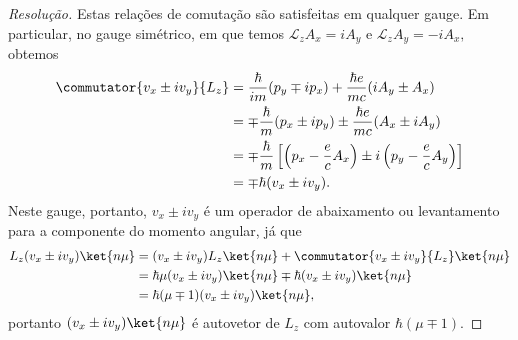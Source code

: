 \begin{proof}[Resolução]
   Estas relações de comutação são satisfeitas em qualquer gauge. Em particular, no gauge simétrico, em que temos \(\mathcal{L}_z A_x = iA_y\) e \(\mathcal{L}_z A_y = - i A_x,\) obtemos
   \begin{align*}
      \commutator{v_x \pm i v_y}{L_z} &= \frac{\hbar}{im} (p_y \mp i p_x) + \frac{\hbar e}{mc} (iA_y  \pm A_x)\\
                                      &= \mp \frac{\hbar}{m} (p_x \pm i p_y) \pm \frac{\hbar e}{mc} (A_x \pm i A_y)\\
                                      &= \mp \frac{\hbar}{m} \left[\left(p_x - \frac{e}{c} A_x\right) \pm i\left(p_y - \frac{e}{c}A_y\right)\right]\\
                                      &= \mp \hbar (v_x \pm i v_y).
   \end{align*}
   Neste gauge, portanto, \(v_x \pm i v_y\) é um operador de abaixamento ou levantamento para a componente do momento angular, já que
   \begin{align*}
      L_z (v_x \pm i v_y) \ket{n \mu} &= (v_x \pm i v_y) L_z \ket{n\mu} + \commutator{v_x \pm i v_y}{L_z} \ket{n\mu}\\
                                      &= \hbar \mu (v_x \pm i v_y) \ket{n \mu} \mp \hbar (v_x \pm i v_y) \ket{n \mu}\\
                                      &= \hbar (\mu \mp 1) (v_x \pm i v_y)\ket{n \mu},
   \end{align*}
   portanto \((v_x \pm i v_y)\ket{n \mu}\) é autovetor de \(L_z\) com autovalor \(\hbar (\mu \mp 1).\)
\end{proof}
